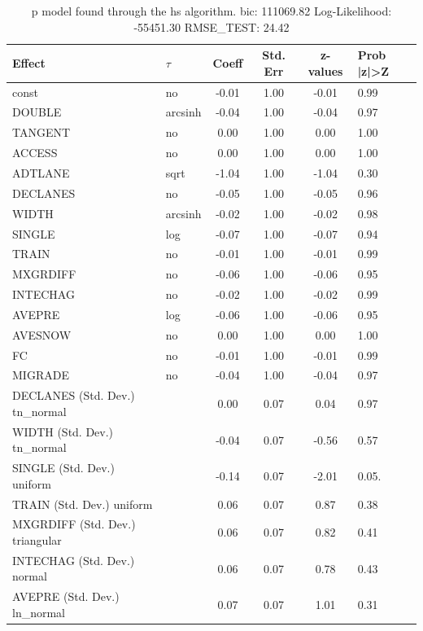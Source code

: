\begin{table}
	\caption{p model found through the hs algorithm. bic: 111069.82 Log-Likelihood: -55451.30 RMSE_TEST: 24.42}
	\begin{center}
		\begin{tabular}{|l|l|c|c|c|l|}
			\hline
			Effect & $\tau$ & Coeff & Std. Err & z-values & Prob |z|>Z \\
			\hline
			const & no & -0.01 & 1.00 & -0.01 & 0.99 \\
			\hline
			DOUBLE & arcsinh & -0.04 & 1.00 & -0.04 & 0.97 \\
			\hline
			TANGENT & no & 0.00 & 1.00 & 0.00 & 1.00 \\
			\hline
			ACCESS & no & 0.00 & 1.00 & 0.00 & 1.00 \\
			\hline
			ADTLANE & sqrt & -1.04 & 1.00 & -1.04 & 0.30 \\
			\hline
			DECLANES & no & -0.05 & 1.00 & -0.05 & 0.96 \\
			\hline
			WIDTH & arcsinh & -0.02 & 1.00 & -0.02 & 0.98 \\
			\hline
			SINGLE & log & -0.07 & 1.00 & -0.07 & 0.94 \\
			\hline
			TRAIN & no & -0.01 & 1.00 & -0.01 & 0.99 \\
			\hline
			MXGRDIFF & no & -0.06 & 1.00 & -0.06 & 0.95 \\
			\hline
			INTECHAG & no & -0.02 & 1.00 & -0.02 & 0.99 \\
			\hline
			AVEPRE & log & -0.06 & 1.00 & -0.06 & 0.95 \\
			\hline
			AVESNOW & no & 0.00 & 1.00 & 0.00 & 1.00 \\
			\hline
			FC & no & -0.01 & 1.00 & -0.01 & 0.99 \\
			\hline
			MIGRADE & no & -0.04 & 1.00 & -0.04 & 0.97 \\
			\hline
			DECLANES (Std. Dev.) tn_normal &  & 0.00 & 0.07 & 0.04 & 0.97 \\
			\hline
			WIDTH (Std. Dev.) tn_normal &  & -0.04 & 0.07 & -0.56 & 0.57 \\
			\hline
			SINGLE (Std. Dev.) uniform &  & -0.14 & 0.07 & -2.01 & 0.05. \\
			\hline
			TRAIN (Std. Dev.) uniform &  & 0.06 & 0.07 & 0.87 & 0.38 \\
			\hline
			MXGRDIFF (Std. Dev.) triangular &  & 0.06 & 0.07 & 0.82 & 0.41 \\
			\hline
			INTECHAG (Std. Dev.) normal &  & 0.06 & 0.07 & 0.78 & 0.43 \\
			\hline
			AVEPRE (Std. Dev.) ln_normal &  & 0.07 & 0.07 & 1.01 & 0.31 \\

\end{tabular}
\end{center}
\end{table}
